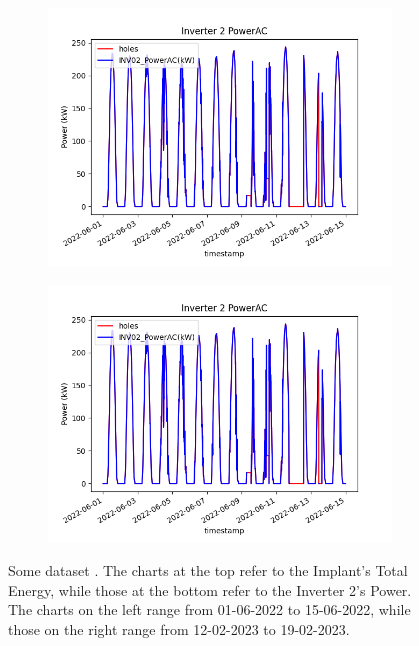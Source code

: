 \begin{figure}[H]
	\begin{subfigure}[t]{0.48\textwidth}
		\centering
		\includegraphics[width=\textwidth, keepaspectratio]{chapters/2_data_preprocessing/imgs/inv02powerbuco1.png}
	\end{subfigure}
	\hspace{0.1cm}
	\begin{subfigure}[t]{0.48\textwidth}
		\centering
		\includegraphics[width=\textwidth, keepaspectratio]{chapters/2_data_preprocessing/imgs/inv02powerbuco1.png}
	\end{subfigure}
	\caption{Some dataset . The charts at the top refer to the Implant's Total Energy, while those at the bottom refer to the Inverter 2's Power. The charts on the left range from 01-06-2022 to 15-06-2022, while those on the right range from 12-02-2023 to 19-02-2023.}
	\label{fig:graficibuchi}
\end{figure}

